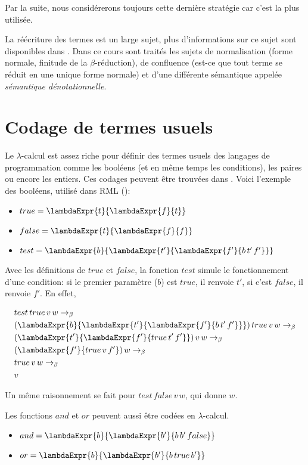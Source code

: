 Par la suite, nous considérerons toujours cette dernière stratégie car c'est la
plus utilisée.

La réécriture des termes est un large sujet, plus d'informations sur ce sujet
sont disponibles dans \cite{ENS-Cachan-cours-lambda-calcul}.
Dans ce cours sont traités les sujets de normalisation (forme normale, finitude
de la $\beta$-réduction), de confluence (est-ce que tout terme se réduit en une
unique forme normale) et d'une différente sémantique appelée \textit{sémantique
dénotationnelle}.

\section{Codage de termes usuels}

Le $\lambda$-calcul est assez riche pour définir des
termes usuels des langages de programmation comme les booléens (et en même temps les
conditions), les paires ou encore les entiers. Ces codages peuvent être trouvées
dans \cite{tapl-untyped-lambda-calculus}. Voici l'exemple des booléens, utilisé dans RML (\cite{rml-github}):

\begin{itemize}
  \item $true = \lambdaExpr{t}{\lambdaExpr{f}{t}}$
  \item $false = \lambdaExpr{t}{\lambdaExpr{f}{f}}$
  \item $test = \lambdaExpr{b}{\lambdaExpr{t'}{\lambdaExpr{f'}{b \, t' \, f'}}}$
\end{itemize}

Avec les définitions de $true$ et $false$, la fonction $test$ simule le fonctionnement d'une condition: si le premier
paramètre ($b$) est $true$, il renvoie $t'$, si c'est $false$, il renvoie
$f'$. En effet,

\begin{align*}
  & test \, true \, v \, w \rightarrow_{\beta} \\
  & (\lambdaExpr{b}{\lambdaExpr{t'}{\lambdaExpr{f'}{b \, t' \, f'}}}) \, true \, v \, w \rightarrow_{\beta} \\
  & (\lambdaExpr{t'}{\lambdaExpr{f'}{true \, t' \, f'}}) \, v \, w \rightarrow_{\beta} \\
  & (\lambdaExpr{f'}{true \, v \, f'}) \, w \rightarrow_{\beta} \\
  & true \, v \, w \rightarrow_{\beta} \\
  & v
\end{align*}

Un même raisonnement se fait pour $test \, false \, v \, w$, qui donne $w$.

Les fonctions $and$ et $or$ peuvent aussi être codées en
$\lambda$-calcul.

\begin{itemize}
  \item $and = \lambdaExpr{b}{\lambdaExpr{b'}{b \, b' \, false}}$
  \item $or = \lambdaExpr{b}{\lambdaExpr{b'}{b \, true \, b'}}$
\end{itemize}